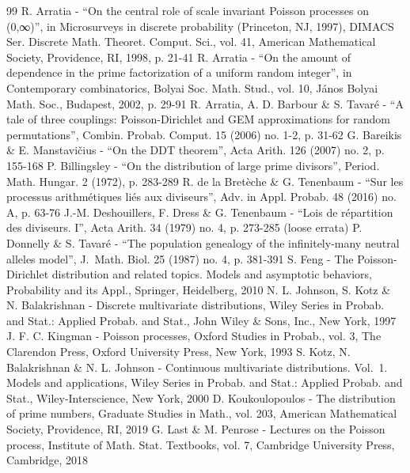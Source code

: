\documentclass[10pt,a4paper]{amsart}
\theoremstyle{plain}
\theoremstyle{definition}
\begin{document}
\begin{thebibliography}{99}
 R. Arratia - “On the central role of scale invariant Poisson processes on (0,∞)”, in Microsurveys in discrete probability (Princeton, NJ, 1997), DIMACS Ser. Discrete Math. Theoret. Comput. Sci., vol. 41, American Mathematical Society, Providence, RI, 1998, p. 21-41
 R. Arratia - “On the amount of dependence in the prime factorization of a uniform random integer”, in Contemporary combinatorics, Bolyai Soc. Math. Stud., vol. 10, János Bolyai Math. Soc., Budapest, 2002, p. 29-91
 R. Arratia, A. D. Barbour \& S. Tavaré - “A tale of three couplings: Poisson-Dirichlet and GEM approximations for random permutations”, Combin. Probab. Comput. 15 (2006) no. 1-2, p. 31-62
 G. Bareikis \& E. Manstavičius - “On the DDT theorem”, Acta Arith. 126 (2007) no. 2, p. 155-168
 P. Billingsley - “On the distribution of large prime divisors”, Period. Math. Hungar. 2 (1972), p. 283-289
 R. de la Bretèche \& G. Tenenbaum - “Sur les processus arithmétiques liés aux diviseurs”, Adv. in Appl. Probab. 48 (2016) no. A, p. 63-76
 J.-M. Deshouillers, F. Dress \& G. Tenenbaum - “Lois de répartition des diviseurs. I”, Acta Arith. 34 (1979) no. 4, p. 273-285 (loose errata)
 P. Donnelly \& S. Tavaré - “The population genealogy of the infinitely-many neutral alleles model”, J. Math. Biol. 25 (1987) no. 4, p. 381-391
 S. Feng - The Poisson-Dirichlet distribution and related topics. Models and asymptotic behaviors, Probability and its Appl., Springer, Heidelberg, 2010
 N. L. Johnson, S. Kotz \& N. Balakrishnan - Discrete multivariate distributions, Wiley Series in Probab. and Stat.: Applied Probab. and Stat., John Wiley \& Sons, Inc., New York, 1997
 J. F. C. Kingman - Poisson processes, Oxford Studies in Probab., vol. 3, The Clarendon Press, Oxford University Press, New York, 1993
 S. Kotz, N. Balakrishnan \& N. L. Johnson - Continuous multivariate distributions. Vol. 1. Models and applications, Wiley Series in Probab. and Stat.: Applied Probab. and Stat., Wiley-Interscience, New York, 2000
 D. Koukoulopoulos - The distribution of prime numbers, Graduate Studies in Math., vol. 203, American Mathematical Society, Providence, RI, 2019
 G. Last \& M. Penrose - Lectures on the Poisson process, Institute of Math. Stat. Textbooks, vol. 7, Cambridge University Press, Cambridge, 2018

\end{thebibliography}
\end{document}
